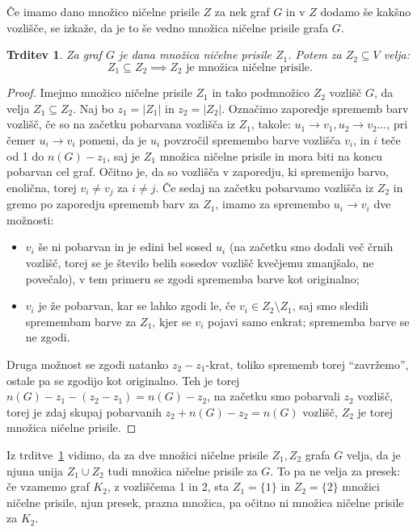 \documentclass[12pt,a4paper,twoside]{article}
\theoremstyle{definition} %
\theoremstyle{plain} %
\newtheorem{trditev}[definicija]{Trditev}
\numberwithin{equation}{section}  %
\begin{document}
Če imamo dano množico ničelne prisile $Z$ za nek graf $G$ in v $Z$ dodamo še kakšno vozlišče, se izkaže, da je to še vedno množica ničelne prisile grafa $G$.
\begin{trditev}
    \label{trd:nadmnozica-zfs-je-zfs}
    Za graf $G$ je dana množica ničelne prisile $Z_1$. Potem za $Z_2 \subseteq V$ velja:
    \[ Z_1 \subseteq Z_2 \implies Z_2 \text{ je množica ničelne prisile}. \]
\end{trditev}
\begin{proof}
    Imejmo množico ničelne prisile $Z_1$ in tako podmnožico $Z_2$ vozlišč $G$, da velja $Z_1 \subseteq Z_2$. Naj bo $z_1 = |Z_1|$ in $z_2 = |Z_2|$. Označimo zaporedje sprememb barv vozlišč, če so na začetku pobarvana vozlišča iz $Z_1$, takole: $u_1 \rightarrow v_1, u_2 \rightarrow v_2 \ldots$, pri čemer $u_i \rightarrow v_i$ pomeni, da je $u_i$ povzročil spremembo barve vozlišča $v_i$, in $i$ teče od 1 do $n(G) - z_1$, saj je $Z_1$ množica ničelne prisile in mora biti na koncu pobarvan cel graf. Očitno je, da so vozlišča v zaporedju, ki spremenijo barvo, enolična, torej $v_i \neq v_j$ za $i \neq j$. Če sedaj na začetku pobarvamo vozlišča iz $Z_2$ in gremo po zaporedju sprememb barv za $Z_1$, imamo za spremembo $u_i \rightarrow v_i$ dve možnosti:
    \begin{itemize}
        \item $v_i$ še ni pobarvan in je edini bel sosed $u_i$ (na začetku smo dodali več črnih vozlišč, torej se je število belih sosedov vozlišč kvečjemu zmanjšalo, ne povečalo), v tem primeru se zgodi sprememba barve kot originalno;
        \item $v_i$ je že pobarvan, kar se lahko zgodi le, če $v_i \in Z_2 \setminus Z_1$, saj smo sledili spremembam barve za $Z_1$, kjer se $v_i$ pojavi samo enkrat; sprememba barve se ne zgodi.
    \end{itemize}
Druga možnost se zgodi natanko $z_2 - z_1$-krat, toliko sprememb torej ``zavržemo'', ostale pa se zgodijo kot originalno. Teh je torej $n(G) - z_1 -(z_2 - z_1) = n(G) - z_2$, na začetku smo pobarvali $z_2$ vozlišč, torej je zdaj skupaj pobarvanih $z_2 + n(G) - z_2 = n(G)$ vozlišč, $Z_2$ je torej množica ničelne prisile.
\end{proof}

Iz trditve~\ref{trd:nadmnozica-zfs-je-zfs} vidimo, da za dve množici ničelne prisile $Z_1, Z_2$ grafa $G$ velja, da je njuna unija $Z_1 \cup Z_2$ tudi množica ničelne prisile za $G$. To pa ne velja za presek: če vzamemo graf $K_2$, z vozliščema 1 in 2, sta $Z_1 = \{1\}$ in $Z_2 = \{2\}$ množici ničelne prisile, njun presek, prazna množica, pa očitno ni množica ničelne prisile za $K_2$.
\end{document}
